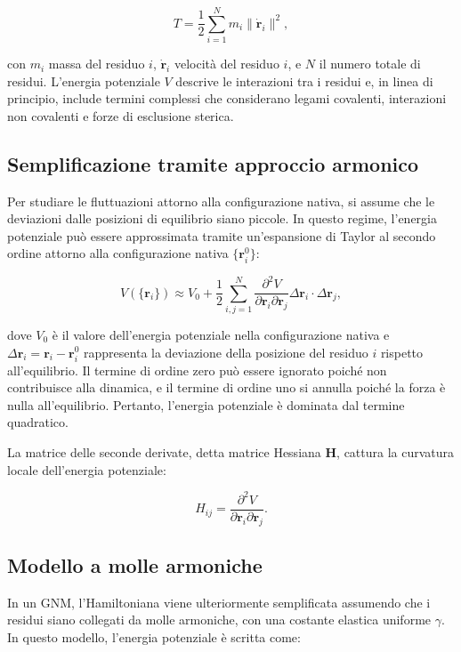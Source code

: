 \documentclass[Lau,binding=0.6cm,oneside,noexaminfo]{sapthesis}
\begin{document}
\begin{equation}
T = \frac{1}{2} \sum_{i=1}^{N} m_i \|\dot{\mathbf{r}}_i\|^2,
\end{equation}

con $m_i$ massa del residuo $i$, $\dot{\mathbf{r}}_i$ velocità del residuo $i$, e $N$ il numero totale di residui. L'energia potenziale $V$ descrive le interazioni tra i residui e, in linea di principio, include termini complessi che considerano legami covalenti, interazioni non covalenti e forze di esclusione sterica.

\subsection*{Semplificazione tramite approccio armonico}
Per studiare le fluttuazioni attorno alla configurazione nativa, si assume che le deviazioni dalle posizioni di equilibrio siano piccole. In questo regime, l'energia potenziale può essere approssimata tramite un'espansione di Taylor al secondo ordine attorno alla configurazione nativa $\{\mathbf{r}_i^0\}$:

\begin{equation}
V(\{\mathbf{r}_i\}) \approx V_0 + \frac{1}{2} \sum_{i,j=1}^N \frac{\partial^2 V}{\partial \mathbf{r}_i \partial \mathbf{r}_j} \Delta \mathbf{r}_i \cdot \Delta \mathbf{r}_j,
\end{equation}

dove $V_0$ è il valore dell'energia potenziale nella configurazione nativa e $\Delta \mathbf{r}_i = \mathbf{r}_i - \mathbf{r}_i^0$ rappresenta la deviazione della posizione del residuo $i$ rispetto all'equilibrio. Il termine di ordine zero può essere ignorato poiché non contribuisce alla dinamica, e il termine di ordine uno si annulla poiché la forza è nulla all'equilibrio. Pertanto, l'energia potenziale è dominata dal termine quadratico.

La matrice delle seconde derivate, detta matrice Hessiana $\mathbf{H}$, cattura la curvatura locale dell'energia potenziale:

\begin{equation}
H_{ij} = \frac{\partial^2 V}{\partial \mathbf{r}_i \partial \mathbf{r}_j}.
\end{equation}

\subsection*{Modello a molle armoniche}
In un GNM, l'Hamiltoniana viene ulteriormente semplificata assumendo che i residui siano collegati da molle armoniche, con una costante elastica uniforme $\gamma$. In questo modello, l'energia potenziale è scritta come:
\end{document}
